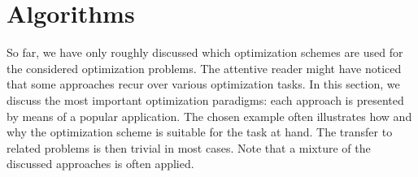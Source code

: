 \chapter{Algorithms}\label{chap:Algorithms}
So far, we have only roughly discussed which optimization schemes are used for the considered optimization problems. The attentive reader might have noticed that some approaches recur over various optimization tasks. In this section, we discuss the most important optimization paradigms: each approach is presented by means of a popular application. The chosen example often illustrates how and why the optimization scheme is suitable for the task at hand. The transfer to related problems is then trivial in most cases. Note that a mixture of the discussed approaches is often applied.
